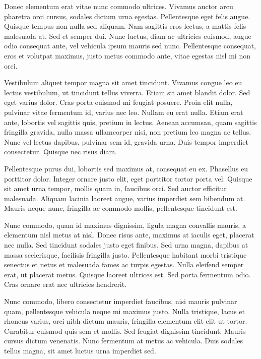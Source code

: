 \documentclass[target=mst,aauheader=,style=]{thud}
\begin{document}
Donec elementum erat vitae nunc commodo ultrices. Vivamus auctor arcu pharetra orci cursus, sodales dictum urna egestas. Pellentesque eget felis augue. Quisque tempus non nulla sed aliquam. Nam sagittis eros lectus, a mattis felis malesuada at. Sed et semper dui. Nunc luctus, diam ac ultricies euismod, augue odio consequat ante, vel vehicula ipsum mauris sed nunc. Pellentesque consequat, eros et volutpat maximus, justo metus commodo ante, vitae egestas nisl mi non orci.

Vestibulum aliquet tempor magna sit amet tincidunt. Vivamus congue leo eu lectus vestibulum, ut tincidunt tellus viverra. Etiam sit amet blandit dolor. Sed eget varius dolor. Cras porta euismod mi feugiat posuere. Proin elit nulla, pulvinar vitae fermentum id, varius nec leo. Nullam eu erat nulla. Etiam erat ante, lobortis vel sagittis quis, pretium in lectus. Aenean accumsan, quam sagittis fringilla gravida, nulla massa ullamcorper nisi, non pretium leo magna ac tellus. Nunc vel lectus dapibus, pulvinar sem id, gravida urna. Duis tempor imperdiet consectetur. Quisque nec risus diam.

Pellentesque purus dui, lobortis sed maximus at, consequat eu ex. Phasellus eu porttitor dolor. Integer ornare justo elit, eget porttitor tortor porta vel. Quisque sit amet urna tempor, mollis quam in, faucibus orci. Sed auctor efficitur malesuada. Aliquam lacinia laoreet augue, varius imperdiet sem bibendum at. Mauris neque nunc, fringilla ac commodo mollis, pellentesque tincidunt est.

Nunc commodo, quam id maximus dignissim, ligula magna convallis mauris, a elementum nisl metus at nisl. Donec risus ante, maximus at iaculis eget, placerat nec nulla. Sed tincidunt sodales justo eget finibus. Sed urna magna, dapibus at massa scelerisque, facilisis fringilla justo. Pellentesque habitant morbi tristique senectus et netus et malesuada fames ac turpis egestas. Nulla eleifend semper erat, ut placerat metus. Quisque laoreet ultrices est. Sed porta fermentum odio. Cras ornare erat nec ultricies hendrerit.

Nunc commodo, libero consectetur imperdiet faucibus, nisi mauris pulvinar quam, pellentesque vehicula neque mi maximus justo. Nulla tristique, lacus et rhoncus varius, orci nibh dictum mauris, fringilla elementum elit elit ut tortor. Curabitur euismod quis sem et mollis. Sed feugiat dignissim tincidunt. Mauris cursus dictum venenatis. Nunc fermentum at metus ac vehicula. Duis sodales tellus magna, sit amet luctus urna imperdiet sed.
\end{document}
